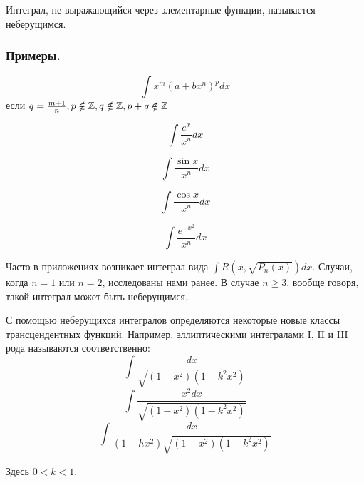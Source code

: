 \opred

Интеграл, не выражающийся через элементарные функции, называется неберущимся.

\subsubsection{Примеры.}
$$\int x^m(a+bx^n)^p dx$$
если $q=\frac{m+1}{n}, p \notin \mathbb{Z}, q \notin\mathbb{Z}, p+q\notin \mathbb{Z}$

$$\int \frac{e^x}{x^n}dx$$

$$\int \frac{\sin x}{x^n}dx$$

$$\int \frac{\cos x}{x^n}dx$$

$$\int \frac{e^{-x^2}}{x^n}dx$$

Часто в приложениях возникает интеграл вида $\int R(x,\sqrt{P_n(x)})dx$. Случаи, когда $n=1$ или $n=2$, исследованы нами ранее. В случае $n \geq 3$, вообще говоря, такой интеграл может быть неберущимся.

С помощью неберущихся интегралов определяются некоторые новые классы трансцендентных функций. Например, эллиптическими интегралами I, II и III рода называются соответственно:
$$\int \frac{dx}{\sqrt{(1-x^2)(1-k^2 x^2)}}$$
$$\int \frac{x^2 dx}{\sqrt{(1-x^2)(1-k^2 x^2)}}$$
$$\int \frac{dx}{(1+hx^2)\sqrt{(1-x^2)(1-k^2 x^2)}}$$

Здесь $0<k<1$.


